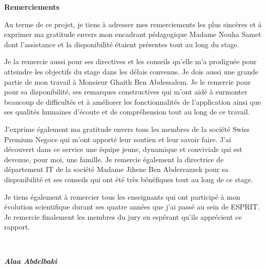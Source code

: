 \thispagestyle{empty}
\begin{center}
    \begin{huge}
        \textbf{Remerciements}
    \end{huge}
\end{center}
\vspace{2cm}
\begin{small}
    \justifying


    Au terme de ce projet, je tiens à adresser mes remerciements les plus sincères et à exprimer ma gratitude envers mon encadrant pédagogique Madame Nouha Samet dont l'assistance et la disponibilité étaient présentes tout au long du stage.


    Je la remercie aussi pour ses directives et les conseils qu'elle m'a prodiguée pour atteindre les objectifs du stage dans les délais convenus.
    Je dois aussi une grande partie de mon travail à Monsieur Ghaith Ben Abdessalem. Je le remercie pour pour sa disponibilité, ses remarques constructives qui m'ont aidé à surmonter beaucoup de difficultés et à améliorer les fonctionnalités de l'application ainsi que ses qualités humaines d'écoute et de compréhension tout au long de ce travail.


    J'exprime également ma gratitude envers tous les membres de la société Swiss Premium Negoce qui m'ont apporté leur soutien et leur savoir faire. J'ai découvert dans ce service une équipe jeune, dynamique et conviviale qui est devenue, pour moi, une famille. Je remercie également la directrice de département IT de la société Madame Jihene Ben Abderrazzek pour sa disponibilité et ses conseils qui ont été très bénéfiques tout au long de ce stage.


    Je tiens également à remercier tous les enseignants qui ont participé à mon évolution scientifique durant ses quatre années que j'ai passé au sein de ESPRIT. Je remercie finalement les membres du jury en espérant qu'ils apprécient ce rapport.
\end{small} \\
\bigbreak
\begin{flushright}
    \textbf{\textit{Alaa Abdelbaki}}
\end{flushright}